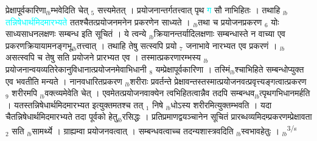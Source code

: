 \documentclass[article,12pt,a4paper]{memoir}%
\newcommand{\quotelemma}[1]{\textcolor{cyan}{#1}}
\newcounter{parCount}
\begin{document}
प्रेक्षापूर्वकारिणा{\tiny $_{lb}$}म्भवेदिति चेत् {\tiny $_{5}$} सत्त्यमेतत् । प्रयोजनान्तर्गतत्त्वात् पृथ \quotelemma{ग} सौ नाभिहितः । तथाहि {\tiny $_{lb}$} \quotelemma{तन्निषेधार्थमिदमारभ्यते} \cite[1b1]{vn-msN} ततश्चैतत्प्रयोजनमनेन प्रकरणेन साध्यते । {\tiny $_{lb}$}तथा च प्रयोजनप्रकरण {\tiny $_{6}$} योः साध्यसाधनलक्षणः सम्बन्ध इति सूचितं । ये त्वन्ये {\tiny $_{lb}$}क्रियानन्तर्यादिलक्षणाः सम्बन्धास्ते न वाच्या एव प्रकरणक्रियायामनङ्गभू{\tiny $_{lb}$}तत्त्वात् । तथाहि तेषु सत्स्वपि प्रयो {\tiny $_{7}$} जनाभावे नारभ्यत एव प्रकरणं । {\tiny $_{lb}$}असत्स्वपि च तेषु सति प्रयोजने प्रारभ्यत एव । तस्मात्प्रकरणारम्भस्य {\tiny $_{lb}$}प्रयोजनान्वयव्यतिरेकानुविधानात्प्रयोजनमेवाभिधानी {\tiny $_{8}$} यम्प्रेक्षापूर्वकारिणा । तस्मिं{\tiny $_{lb}$}श्चाभिहिते सम्बन्धोप्युक्त एव भवतीति मन्यते । नानवधारितप्रकरण {\tiny $_{lb}$}शरीराः प्रवर्तन्ते प्रेक्षावन्तस्तस्मात्प्रयोजनवत्प्रवृत्त्यङ्गत्वात्प्रकरण {\tiny $_{9}$}\leavevmode{} शरीरमपि {\tiny $_{lb}$}वक्त्व्यमेवेति चेत् । एवमेतत्प्रयोजनवाक्येन त्वभिहितत्वान्नैव तदपि सम्बन्धव{\tiny $_{lb}$}त्पृथगभिधानमर्हति । यतस्तन्निषेधार्थमिदमारभ्यत इत्युक्तमतश्च तत् {\tiny $_{1}$} निषे {\tiny $_{lb}$}धोऽस्य शरीरमित्युक्तम्भवति । यदा चैतन्निषेधार्थमिदमारभ्यते तदा पूर्वको हेतु{\tiny $_{lb}$}रसिद्धः । प्रतिप्रमाणद्वयञ्चानेन सूचितं प्रारब्धव्यमिदम्प्रकरणम्प्रेक्षावता {\tiny $_{2}$} सति {\tiny $_{lb}$}सामर्थ्ये । ग्राह्यम्वा प्रयोजनवत्वात् । सम्बन्धवत्वाच्च तदन्यशास्त्रवदिति {\tiny $_{lb}$}स्वभावहेतुः ।
	{}
	\pend%
      {\tiny $_{lb}$}\textsuperscript{\textenglish{3/s}}
\end{document}
